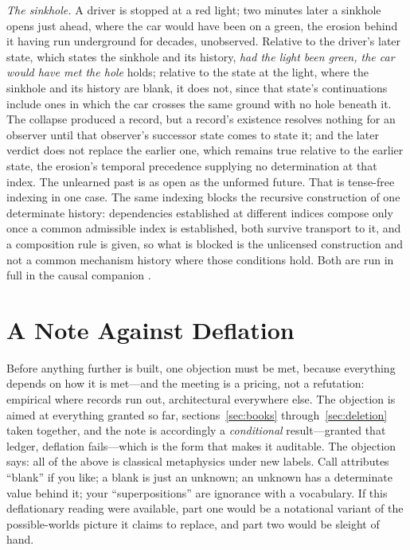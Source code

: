\documentclass[11pt]{article}
\theoremstyle{definition}
\begin{document}
\emph{The sinkhole.} A driver is stopped at a red light; two minutes later a sinkhole opens just ahead, where the car would have been on a green, the erosion behind it having run underground for decades, unobserved. Relative to the driver's later state, which states the sinkhole and its history, \emph{had the light been green, the car would have met the hole} holds; relative to the state at the light, where the sinkhole and its history are blank, it does not, since that state's continuations include ones in which the car crosses the same ground with no hole beneath it. The collapse produced a record, but a record's existence resolves nothing for an observer until that observer's successor state comes to state it; and the later verdict does not replace the earlier one, which remains true relative to the earlier state, the erosion's temporal precedence supplying no determination at that index. The unlearned past is as open as the unformed future. That is tense-free indexing in one case. The same indexing blocks the recursive construction of one determinate history: dependencies established at different indices compose only once a common admissible index is established, both survive transport to it, and a composition rule is given, so what is blocked is the unlicensed construction and not a common mechanism history where those conditions hold. Both are run in full in the causal companion \cite{AethusCausality}.



\section{A Note Against Deflation}\label{sec:nogo}

Before anything further is built, one objection must be met, because everything depends on how it is met---and the meeting is a pricing, not a refutation: empirical where records run out, architectural everywhere else. The objection is aimed at everything granted so far, sections~\ref{sec:books} through~\ref{sec:deletion} taken together, and the note is accordingly a \emph{conditional} result---granted that ledger, deflation fails---which is the form that makes it auditable. The objection says: all of the above is classical metaphysics under new labels. Call attributes ``blank'' if you like; a blank is just an unknown; an unknown has a determinate value behind it; your ``superpositions'' are ignorance with a vocabulary. If this deflationary reading were available, part one would be a notational variant of the possible-worlds picture it claims to replace, and part two would be sleight of hand.
\end{document}
